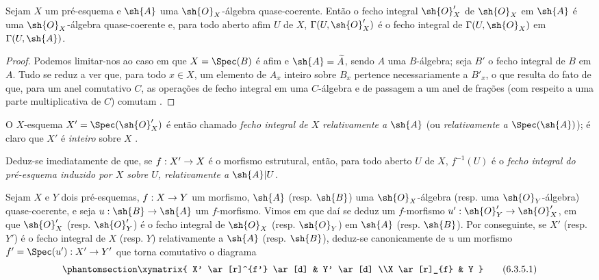 \documentclass[oneside,10pt]{amsart}
\makeatletter
\newcommand{\ega@arrow}[2]{\mathchoice{#1}{#2}{#2}{#2}}
\renewcommand{\to}{\ega@arrow{\longrightarrow}{\rightarrow}}
\newcommand{\oldpage}[2][]{\marginnote{\normalfont\footnotesize\textbf{#1}~|~#2}\ignorespaces}
\let\EGAOriginalLabel\label
\renewcommand{\label}[1]{\phantomsection\EGAOriginalLabel{#1}}
\makeatother
\begin{document}
\begin{proposition}[6.3.4]
\label{II.6.3.4}
Sejam $X$ um pré-esquema e $\sh{A}$ uma $\sh{O}_X$-álgebra quase-coerente.
Então o fecho integral $\sh{O}'_X$ de $\sh{O}_X$ em $\sh{A}$ é uma $\sh{O}_X$-álgebra quase-coerente e, para todo aberto afim $U$ de $X$, $\Gamma(U,\sh{O}'_X)$ é o fecho integral de $\Gamma(U,\sh{O}_X)$ em $\Gamma(U,\sh{A})$.
\end{proposition}

\begin{proof}
Podemos limitar-nos ao caso em que $X=\Spec(B)$ é afim e $\sh{A}=\widetilde{A}$, sendo $A$ uma
\oldpage[II]{118}
$B$-álgebra; seja $B'$ o fecho integral de $B$ em $A$.
Tudo se reduz a ver que, para todo $x\in X$, um elemento de $A_x$ inteiro sobre $B_x$ pertence necessariamente a $B'_x$, o que resulta do fato de que, para um anel comutativo $C$, as operações de fecho integral em uma $C$-álgebra e de passagem a um anel de frações (com respeito a uma parte multiplicativa de $C$) comutam \cite[t.~I, pp.~261 e 257]{I-13}.
\end{proof}

O $X$-esquema $X'=\Spec(\sh{O}'_X)$ é então chamado \emph{fecho integral de $X$ relativamente a $\sh{A}$} (ou \emph{relativamente a $\Spec(\sh{A})$});
é claro que $X'$ é \emph{inteiro} sobre $X$ .

Deduz-se imediatamente de  que, se $f:X'\to X$ é o morfismo estrutural, então, para todo aberto $U$ de $X$, $f^{-1}(U)$ é o \emph{fecho integral do pré-esquema induzido por $X$ sobre $U$, relativamente a $\sh{A}|U$}.

\begin{env}[6.3.5]
\label{II.6.3.5}
Sejam $X$ e $Y$ dois pré-esquemas, $f:X\to Y$ um morfismo, $\sh{A}$ (resp. $\sh{B}$) uma $\sh{O}_X$-álgebra (resp. uma $\sh{O}_Y$-álgebra) quase-coerente, e seja $u:\sh{B}\to\sh{A}$ um $f$-morfismo.
Vimos em  que daí se deduz um $f$-morfismo $u':\sh{O}'_Y\to\sh{O}'_X$, em que $\sh{O}'_X$ (resp. $\sh{O}'_Y$) é o fecho integral de $\sh{O}_X$ (resp. $\sh{O}_Y$) em $\sh{A}$ (resp. $\sh{B}$).
Por conseguinte, se $X'$ (resp. $Y'$) é o fecho integral de $X$ (resp. $Y$) relativamente a $\sh{A}$ (resp. $\sh{B}$), deduz-se canonicamente de $u$ um morfismo $f'=\Spec(u'):X'\to Y'$  que torna comutativo o diagrama
\[
\label{II.6.3.5.1}
  \xymatrix{
    X' \ar[r]^{f'} \ar[d]
    & Y' \ar[d]
  \\X \ar[r]_{f}
    & Y
  }
\tag{6.3.5.1}
\]
\end{env}
\end{document}
